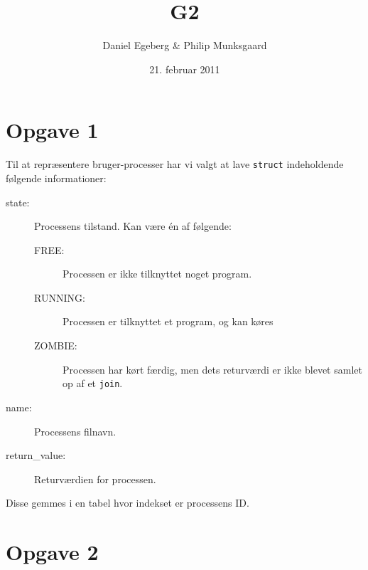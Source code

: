 \documentclass [10pt,a4paper]{article}
\title{G2}
\author{Daniel Egeberg \& Philip Munksgaard}
\date{21. februar 2011}
\begin{document}
\maketitle

\section*{Opgave 1} %

Til at repræsentere bruger-processer har vi valgt at lave \verb+struct+
indeholdende følgende informationer:

\begin{description}
    \item[state:] Processens tilstand. Kan være én af følgende:
        \begin{description}
            \item[FREE:] Processen er ikke tilknyttet noget program.
            \item[RUNNING:] Processen er tilknyttet et program, og kan køres
            \item[ZOMBIE:] Processen har kørt færdig, men dets returværdi er
                ikke blevet samlet op af et \verb+join+.
        \end{description}
    \item[name:] Processens filnavn.
    \item[return\_value:] Returværdien for processen.
\end{description}

Disse gemmes i en tabel hvor indekset er processens ID.


\section*{Opgave 2} %

\end{document}
